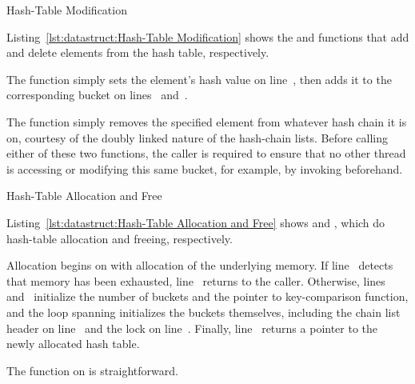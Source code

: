 \begin{listing}[tb]

\caption{Hash-Table Modification}
\label{lst:datastruct:Hash-Table Modification}
\end{listing}

Listing~\ref{lst:datastruct:Hash-Table Modification}
shows the  and  functions
that add and delete elements from the hash table, respectively.

\begin{fcvref}
The  function simply sets the element's hash
value on line~, then adds it to the corresponding bucket on
lines~ and~.
\end{fcvref}
The  function simply removes the specified element
from whatever hash chain it is on, courtesy of the doubly linked
nature of the hash-chain lists.
Before calling either of these two functions, the caller is required to
ensure that no other thread is accessing
or modifying this same bucket, for example, by invoking
 beforehand.

\begin{listing}[tb]

\caption{Hash-Table Allocation and Free}
\label{lst:datastruct:Hash-Table Allocation and Free}
\end{listing}

Listing~\ref{lst:datastruct:Hash-Table Allocation and Free}
shows  and ,
which do hash-table allocation and freeing, respectively.
\begin{fcvref}
Allocation begins on
 with allocation of the underlying memory.
If line~ detects that memory has been exhausted,
line~ returns
 to the caller.
Otherwise, lines~ and~ initialize
the number of buckets and the pointer to key-comparison function,
and the loop
spanning  initializes the buckets themselves,
including the chain list header on
line~ and the lock on line~.
Finally, line~ returns a pointer to the newly allocated hash table.
\end{fcvref}
\begin{fcvref}
The  function on
 is straightforward.
\end{fcvref}

